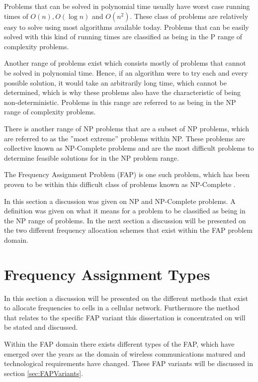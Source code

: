 Problems that can be solved in polynomial time usually have worst case running times of $O(n),O(\log n)$ and $O(n^2)$. These class of problems are relatively easy to solve using most algorithms available today. Problems that can be easily solved with this kind of running times are classified as being in the P range of complexity problems\cite{AIModernApproach}.

Another range of problems exist which consists mostly of problems that cannot be solved in polynomial time. Hence, if an algorithm were to try each and every possible solution, it would take an arbitrarily long time, which cannot be determined, which is why these problems also have the characteristic of being non-deterministic. Problems in this range are referred to as being in the NP range of complexity problems\cite{AIModernApproach}.

There is another range of NP problems that are a subset of NP problems, which are referred to as the ''most extreme'' problems within NP.  These problems are collective known as NP-Complete problems and are the most difficult problems to determine feasible solutions for in the NP problem range\cite{AIModernApproach}.

The Frequency Assignment Problem (FAP) is one such problem, which has been proven to be within this difficult class of problems known as NP-Complete \cite{MontemanniThesis,Eisenblatter,Karen2004,AndreasPaper,FixedFAPPSO}.

In this section a discussion was given on NP and NP-Complete problems. A definition was given on what it means for a problem to be classified as being in the NP range of problems. In the next section a discussion will be presented on the two different frequency allocation schemes that exist within the FAP problem domain.

\section{Frequency Assignment Types}
\label{sec:FreqAssignmentTypes}
In this section a discussion will be presented on the different methods that exist to allocate frequencies to cells in a cellular network. Furthermore the method that relates to the specific FAP variant this dissertation is concentrated on will be stated and discussed.

Within the FAP domain there exists different types of the FAP, which have emerged over the years as the domain of wireless communications matured and technological requirements have changed. These FAP variants will be discussed in section \ref{sec:FAPVariants}.

